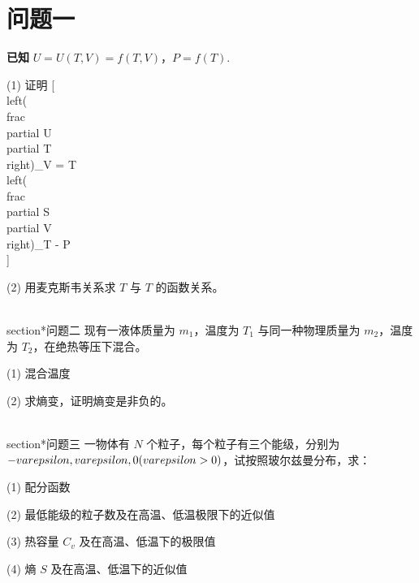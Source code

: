 \section{问题一}
\textbf{已知} $U = U(T, V) = f(T, V)$，$P = f(T)$.

(1) 证明
[\\left( \\frac{\\partial U}{\\partial T} \\right)_V = T \\left( \\frac{\\partial S}{\\partial V} \\right)_T - P\\]

(2) 用麦克斯韦关系求 $T$ 与 $T$ 的函数关系。

\\section*{问题二}
现有一液体质量为 $m_1$，温度为 $T_1$ 与同一种物理质量为 $m_2$，温度为 $T_2$，在绝热等压下混合。

(1) 混合温度

(2) 求熵变，证明熵变是非负的。

\\section*{问题三}
一物体有 $N$ 个粒子，每个粒子有三个能级，分别为 $-\\varepsilon, \\varepsilon, 0 (\\varepsilon > 0)$，试按照玻尔兹曼分布，求：

(1) 配分函数

(2) 最低能级的粒子数及在高温、低温极限下的近似值

(3) 热容量 $C_v$ 及在高温、低温下的极限值

(4) 熵 $S$ 及在高温、低温下的近似值